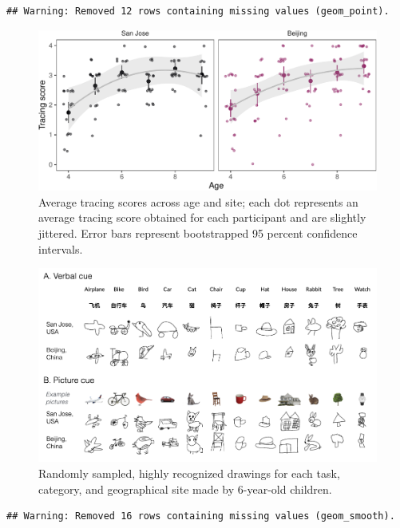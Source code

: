 \documentclass[
  english,
  man]{apa6}
\begin{document}
\begin{verbatim}
## Warning: Removed 12 rows containing missing values (geom_point).
\end{verbatim}

\begin{figure}[H]

{\centering \includegraphics[width=\textwidth]{Manuscript_June2021_files/figure-latex/tracing-1} 

}

\caption{Average tracing scores across age and site; each dot represents an average tracing score obtained for each participant and are slightly jittered. Error bars represent bootstrapped 95 percent confidence intervals.}\label{fig:tracing}
\end{figure}
\begin{figure}[H]
\includegraphics[width=1\linewidth]{figs/example_drawings} \caption{Randomly sampled, highly recognized drawings for each task, category, and geographical site made by 6-year-old children.}\label{fig:example-drawings}
\end{figure}

\begin{verbatim}
## Warning: Removed 16 rows containing missing values (geom_smooth).
\end{verbatim}
\end{document}
